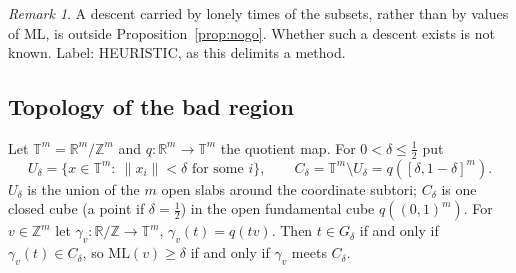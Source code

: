 \documentclass[11pt]{article}
\theoremstyle{remark}
\newtheorem{remark}[theorem]{Remark}
\newcommand{\norm}[1]{\lVert #1\rVert}
\newcommand{\ML}{\mathrm{ML}}
\newcommand{\Z}{\mathbb{Z}}
\newcommand{\R}{\mathbb{R}}
\begin{document}
\begin{remark}\label{rem:desc-ground}
A descent carried by lonely times of the subsets, rather than by values of $\ML$, is outside Proposition~\ref{prop:nogo}. Whether such a descent exists is not known. Label: HEURISTIC, as this delimits a method.
\end{remark}

\subsection{Topology of the bad region}\label{sec:topology}

Let $\mathbb T^m=\R^m/\Z^m$ and $q:\R^m\to\mathbb T^m$ the quotient map. For $0<\delta\le\frac12$ put
\[U_\delta=\{x\in\mathbb T^m:\ \norm{x_i}<\delta\text{ for some }i\},\qquad C_\delta=\mathbb T^m\setminus U_\delta=q([\delta,1-\delta]^m).\]
$U_\delta$ is the union of the $m$ open slabs around the coordinate subtori; $C_\delta$ is one closed cube (a point if $\delta=\frac12$) in the open fundamental cube $q((0,1)^m)$. For $v\in\Z^m$ let $\gamma_v:\R/\Z\to\mathbb T^m$, $\gamma_v(t)=q(tv)$. Then $t\in G_\delta$ if and only if $\gamma_v(t)\in C_\delta$, so $\ML(v)\ge\delta$ if and only if $\gamma_v$ meets $C_\delta$.
\end{document}

